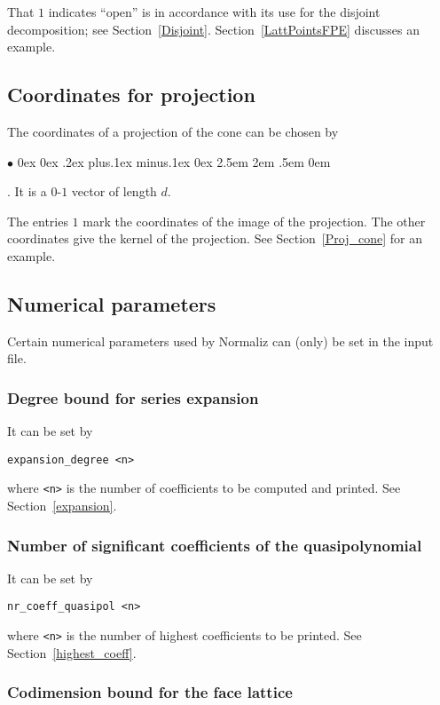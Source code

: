 \documentclass[12pt,a4paper]{scrartcl}
\newcommand{\stdli}{ \topsep0ex \partopsep0ex %
\parsep.2ex plus.1ex minus.1ex \itemsep0ex%
\leftmargin2.5em \labelwidth2em \labelsep.5em \rightmargin0em}%
\renewenvironment{itemize}{\begin{list}{{$\bullet$}}{\stdli}}{\end{list}}
\theoremstyle{definition}
\def\itemtt[#1]{\item[\textbf{\ttt{#1}}]}
\def\ttt{\texttt}
\begin{document}
That $1$ indicates ``open'' is in accordance with its use for the disjoint decomposition; see Section~\ref{Disjoint}. Section~\ref{LattPointsFPE} discusses an example.

\subsection{Coordinates for projection}

The coordinates of a projection of the cone can be chosen by
\begin{itemize}
	\itemtt[projection\_coordinates]. It is a $0$-$1$ vector of length $d$.
\end{itemize}
The entries $1$ mark the coordinates of the image of the projection. The other coordinates give the kernel of the projection. See Section~\ref{Proj_cone} for an example.

\subsection{Numerical parameters}

Certain numerical parameters used by Normaliz can (only) be set in the input file.

\subsubsection{Degree bound for series expansion}

It can be set by
\begin{Verbatim}
expansion_degree <n>
\end{Verbatim}
where \verb|<n>| is the number of coefficients to be computed and printed. See Section~\ref{expansion}.

\subsubsection{Number of significant coefficients of the quasipolynomial}

It can be set by
\begin{Verbatim}
nr_coeff_quasipol <n>
\end{Verbatim}
where \verb|<n>| is the number of highest coefficients to be printed. See Section~\ref{highest_coeff}.

\subsubsection{Codimension bound for the face lattice}
\end{document}
